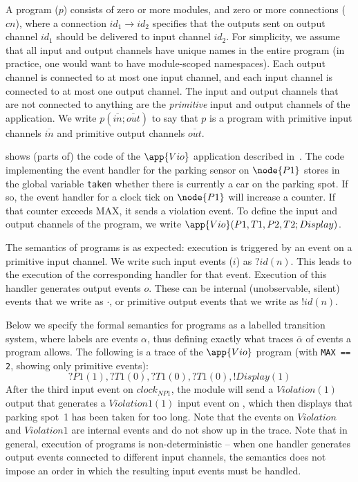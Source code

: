 A program ($p$) consists of zero or more modules, and zero or more
connections ($cn$), where a connection $id_1 \to id_2$ specifies that the
outputs sent on output channel $id_1$ should be delivered to input channel
$id_2$. For simplicity, we assume that all input and output channels have
unique names in the entire program (in practice, one would want to have
module-scoped namespaces). Each output channel is connected to at most one
input channel, and each input channel is connected to at most one output
channel. The input and output channels that are not connected to anything
are the {\em primitive} input and output channels of the application. We
write $p(\overline{in};\overline{out})$ to say that $p$ is a program with
primitive input channels $\overline{in}$ and primitive output channels
$\overline{out}$.

 shows (parts of) the code of the $\app{Vio}$ application
described in~\cite{noorman:authentic-execution}.  The
code implementing the event handler for the parking sensor on $\node{P1}$ stores in the global
variable \verb+taken+ whether there is currently a car on the parking spot.
If so, the event handler for a clock tick on $\node{P1}$ will increase a counter. If
that counter exceeds MAX, it sends a violation event. To define the input
and output channels of the  program, we write
$\app{Vio}(P1,T1,P2,T2;Display)$.

The semantics of programs is as expected: execution is triggered
by an event on a primitive input channel. We write such input events ($i$)
as $ ?id(n) $.  This leads to the execution of the corresponding handler
for that event. Execution of this handler generates  output events $o$.
These can be internal (unobservable, silent) events that we write as
$\cdot$, or primitive output events that we write as  $ !id(n) $. 

Below we specify the formal semantics for programs as a labelled transition system, where labels are events $\alpha$, thus defining exactly what traces $\overline{\alpha}$ of events a program allows.
The following is a trace of the $\app{Vio}$ program (with \texttt{MAX == 2}, showing only primitive events):
%
\[
   ?P1(1), ?T1(0), ?T1(0),
   ?T1(0), !Display(1)
\]
%
After the third  input event on $clock_{NP1}$, the 
module will send a $Violation(1)$ output that generates a $Violation1(1)$ input event on
, which then displays that parking spot~1 has been
taken for too long.  Note that the events on $Violation$ and $Violation1$ are internal events and do not show up in the trace.
%
Note that in general, execution of programs is non-deterministic -- when one handler generates output events connected to different input channels, the semantics does not impose an order in
which the resulting input events must be handled. 

